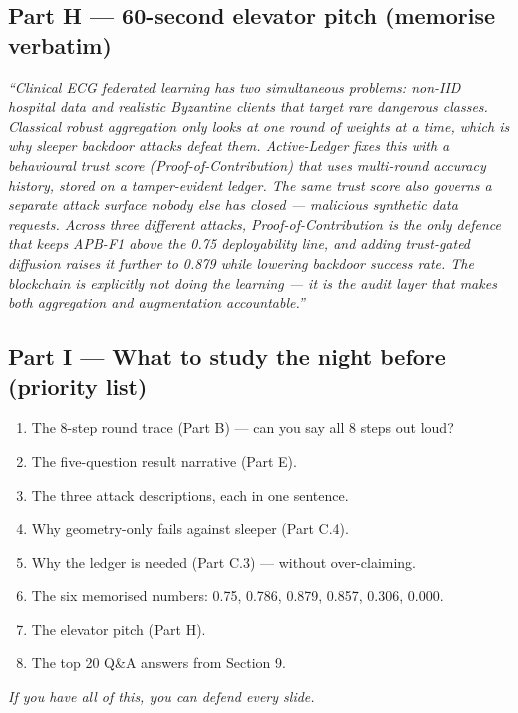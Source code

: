 \documentclass[11pt,a4paper]{article}
\begin{document}
\subsection{Part H --- 60-second elevator pitch (memorise verbatim)}

\textit{``Clinical ECG federated learning has two simultaneous problems: 
non-IID hospital data and realistic Byzantine clients that target rare 
dangerous classes. Classical robust aggregation only looks at one 
round of weights at a time, which is why sleeper backdoor attacks 
defeat them. Active-Ledger fixes this with a behavioural trust score 
(Proof-of-Contribution) that uses multi-round accuracy history, 
stored on a tamper-evident ledger. The same trust score also 
governs a separate attack surface nobody else has closed --- 
malicious synthetic data requests. Across three different attacks, 
Proof-of-Contribution is the only defence that keeps APB-F1 above 
the 0.75 deployability line, and adding trust-gated diffusion raises 
it further to 0.879 while lowering backdoor success rate. The 
blockchain is explicitly not doing the learning --- it is the audit 
layer that makes both aggregation and augmentation accountable.''}

\subsection{Part I --- What to study the night before (priority list)}

\begin{enumerate}
\item The 8-step round trace (Part B) --- can you say all 8 steps out loud?
\item The five-question result narrative (Part E).
\item The three attack descriptions, each in one sentence.
\item Why geometry-only fails against sleeper (Part C.4).
\item Why the ledger is needed (Part C.3) --- without over-claiming.
\item The six memorised numbers: 0.75, 0.786, 0.879, 0.857, 0.306, 0.000.
\item The elevator pitch (Part H).
\item The top 20 Q\&A answers from Section 9.
\end{enumerate}

\textit{If you have all of this, you can defend every slide.}
\end{document}
